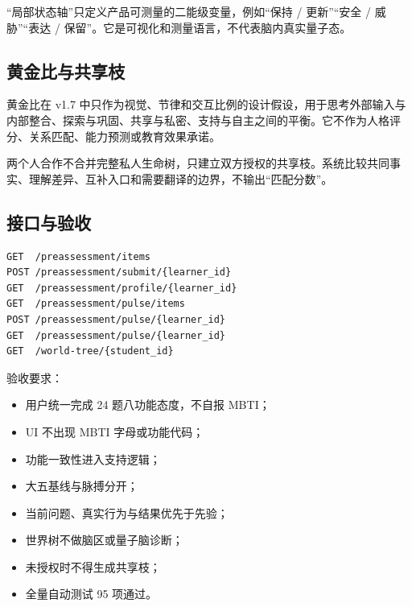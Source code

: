 \documentclass[UTF8,a4paper,11pt]{ctexart}
\begin{document}
“局部状态轴”只定义产品可测量的二能级变量，例如“保持 / 更新”“安全 / 威胁”“表达 / 保留”。它是可视化和测量语言，不代表脑内真实量子态。

\subsection{黄金比与共享枝}

黄金比在 v1.7 中只作为视觉、节律和交互比例的设计假设，用于思考外部输入与内部整合、探索与巩固、共享与私密、支持与自主之间的平衡。它不作为人格评分、关系匹配、能力预测或教育效果承诺。

两个人合作不合并完整私人生命树，只建立双方授权的共享枝。系统比较共同事实、理解差异、互补入口和需要翻译的边界，不输出“匹配分数”。

\subsection{接口与验收}

\begin{verbatim}
GET  /preassessment/items
POST /preassessment/submit/{learner_id}
GET  /preassessment/profile/{learner_id}
GET  /preassessment/pulse/items
POST /preassessment/pulse/{learner_id}
GET  /preassessment/pulse/{learner_id}
GET  /world-tree/{student_id}
\end{verbatim}

验收要求：

\begin{itemize}
\item 用户统一完成 24 题八功能态度，不自报 MBTI；
\item UI 不出现 MBTI 字母或功能代码；
\item 功能一致性进入支持逻辑；
\item 大五基线与脉搏分开；
\item 当前问题、真实行为与结果优先于先验；
\item 世界树不做脑区或量子脑诊断；
\item 未授权时不得生成共享枝；
\item 全量自动测试 95 项通过。
\end{itemize}
\end{document}

